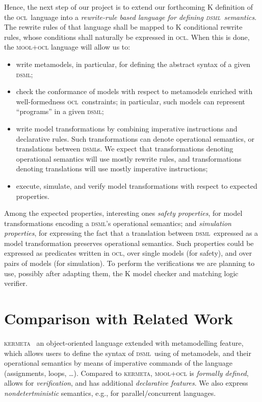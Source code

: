 \documentclass[a4paper,11pt,twoside]{article}
\newcommand{\dsml}{\textsc{dsml}}
\newcommand{\dsmls}{\textsc{dsml}s}
\newcommand{\kmt}{\textsc{kermeta}}
\newcommand{\ocl}{\textsc{ocl}}
\begin{document}
Hence, the next step of our project is to extend  our forthcoming K definition of the \ocl\ language into  a \emph{rewrite-rule based language for defining \dsml\ semantics}. The rewrite
rules of that language shall be  mapped to K conditional rewrite rules, whose conditions shall naturally be expressed in \ocl. When this is done, the  \textsc{mool+ocl}  language will 
allow us to:
\begin{itemize}
\item write metamodels, in particular, for defining the abstract syntax of a given \dsml;
\item check the conformance of models with respect to  metamodels enriched with well-formedness \ocl\ constraints; in particular, such models can represent ``programs'' in a given \dsml;
\item write model transformations by combining imperative instructions and declarative rules. Such transformations can denote operational semantics, 
or translations between   \dsmls. We expect that  transformations denoting operational semantics will use mostly rewrite rules, and  transformations denoting translations will use mostly imperative instructions;
\item execute, simulate, and verify model transformations with respect to expected properties.
\end{itemize}
Among the expected properties, interesting ones \emph{safety properties}, for model transformations encoding a \dsml's operational semantics; and \emph{simulation properties}, for expressing the fact that a translation between \dsml\ expressed as a model transformation 
preserves operational semantics. Such properties could be expressed as predicates written in \ocl, over single models (for safety), and over pairs of models (for simulation). To perform the verifications we are planning to use, possibly after adapting them, the K model checker and matching logic verifier.



\section*{Comparison with Related Work}
\kmt~\cite{DBLP:conf/uml/MullerFJ05} an object-oriented language extended with metamodelling feature,  which allows users to define the syntax of \dsml\ using of metamodels, and their operational semantics
by means of imperative commands of the language (assignments, loops, \ldots). Compared to \kmt, \textsc{mool+ocl} is \emph{formally defined}, allows for \emph{verification}, and
has additional \emph{declarative features}. We  also express \emph{nondetertministic} semantics, e.g., for  parallel/concurrent languages.
\end{document}
